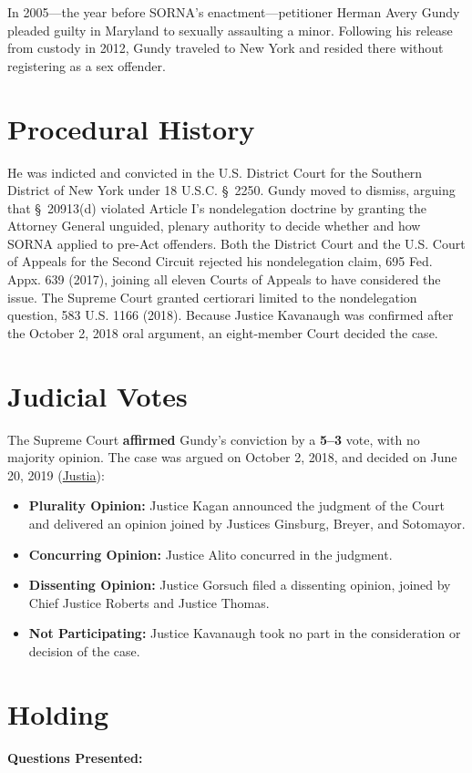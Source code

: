\documentclass[12pt]{article}
\begin{document}
In 2005---the year before SORNA's enactment---petitioner Herman Avery Gundy pleaded guilty in Maryland to sexually assaulting a minor. Following his release from custody in 2012, Gundy traveled to New York and resided there without registering as a sex offender.

\section{Procedural History}
He was indicted and convicted in the U.S. District Court for the Southern District of New York under 18 U.S.C. \S~2250. Gundy moved to dismiss, arguing that \S~20913(d) violated Article I's nondelegation doctrine by granting the Attorney General unguided, plenary authority to decide whether and how SORNA applied to pre-Act offenders. Both the District Court and the U.S. Court of Appeals for the Second Circuit rejected his nondelegation claim, 695 Fed. Appx. 639 (2017), joining all eleven Courts of Appeals to have considered the issue. The Supreme Court granted certiorari limited to the nondelegation question, 583 U.S. 1166 (2018). Because Justice Kavanaugh was confirmed after the October 2, 2018 oral argument, an eight-member Court decided the case.

\section{Judicial Votes}
The Supreme Court \textbf{affirmed} Gundy's conviction by a \textbf{5--3} vote, with no majority opinion. The case was argued on October 2, 2018, and decided on June 20, 2019 (\href{https://supreme.justia.com/cases/federal/us/588/17-6086/}{Justia}):

\begin{itemize}
    \item \textbf{Plurality Opinion:} Justice Kagan announced the judgment of the Court and delivered an opinion joined by Justices Ginsburg, Breyer, and Sotomayor.
    \item \textbf{Concurring Opinion:} Justice Alito concurred in the judgment.
    \item \textbf{Dissenting Opinion:} Justice Gorsuch filed a dissenting opinion, joined by Chief Justice Roberts and Justice Thomas.
    \item \textbf{Not Participating:} Justice Kavanaugh took no part in the consideration or decision of the case.
\end{itemize}

\section{Holding}
\textbf{Questions Presented:}
\end{document}

